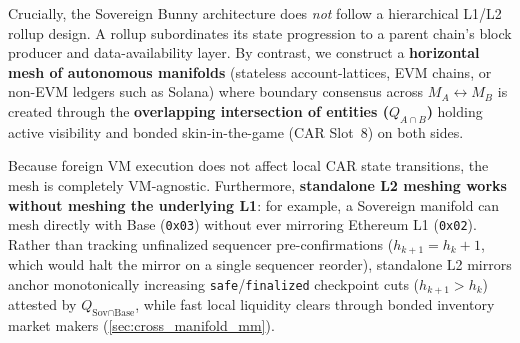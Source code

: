 \documentclass[a4paper,11pt,twoside,parskip=half-,headings=small]{scrartcl}
\newcommand{\code}[1]{\texttt{#1}}
\begin{document}
Crucially, the Sovereign Bunny architecture does \emph{not} follow a hierarchical L1/L2 rollup design. A rollup subordinates its state progression to a parent chain's block producer and data-availability layer. By contrast, we construct a \textbf{horizontal mesh of autonomous manifolds} (stateless account-lattices, EVM chains, or non-EVM ledgers such as Solana) where boundary consensus across $M_A \leftrightarrow M_B$ is created through the \textbf{overlapping intersection of entities ($Q_{A \cap B}$)} holding active visibility and bonded skin-in-the-game (CAR Slot~8) on both sides.

Because foreign VM execution does not affect local CAR state transitions, the mesh is completely VM-agnostic. Furthermore, \textbf{standalone L2 meshing works without meshing the underlying L1}: for example, a Sovereign manifold can mesh directly with Base (\code{0x03}) without ever mirroring Ethereum L1 (\code{0x02}). Rather than tracking unfinalized sequencer pre-confirmations ($h_{k+1} = h_k + 1$, which would halt the mirror on a single sequencer reorder), standalone L2 mirrors anchor monotonically increasing \code{safe}/\code{finalized} checkpoint cuts ($h_{k+1} > h_k$) attested by $Q_{\text{Sov} \cap \text{Base}}$, while fast local liquidity clears through bonded inventory market makers (\cref{sec:cross_manifold_mm}).
\end{document}
